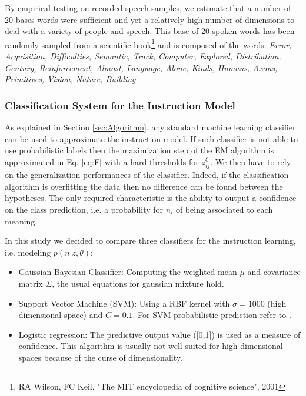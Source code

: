 By empirical testing on recorded speech samples, we estimate that a number of 20 bases words were sufficient and yet a relatively high number of dimensions to deal with a variety of people and speech. This base of 20 spoken words has been randomly sampled from a scientific book\footnote{RA Wilson, FC Keil, "The MIT encyclopedia of cognitive science", 2001} and is composed of the words: \emph{ \footnotesize{Error, Acquisition, Difficulties, Semantic, Track, Computer, Explored, Distribution, Century, Reinforcement, Almost, Language, Alone, Kinds, Humans, Axons, Primitives, Vision, Nature, Building}}.
%
\subsubsection{Classification System for the Instruction Model}
\label{sec:classifiers}
%
As explained in Section \ref{sec:Algorithm}, any standard machine learning classifier can be used to approximate the instruction model. If such classifier is not able to use probabilistic labels then the maximization step of the EM algorithm is approximated in Eq. \ref{eq:F} with a hard thresholds for $z_{ij}^{\xi}$. We then have to rely on the generalization performances of the classifier. Indeed, if the classification algorithm is overfitting the data then no difference can be found between the hypotheses. The only required characteristic is the ability to output a confidence on the class prediction, i.e. a probability for $n_i$ of being associated to each meaning.

In this study we decided to compare three classifiers for the instruction learning, i.e. modeling $p(n|z,\theta)$:
\begin{itemize}
\item Gaussian Bayesian Classifier: Computing the weighted mean $\mu$ and covariance matrix $\Sigma$, the usual equations for gaussian mixture hold.
\item Support Vector Machine (SVM): Using a RBF kernel with $\sigma = 1000$ (high dimensional space) and $C = 0.1$.  For SVM probabilistic prediction refer to \cite{platt1999probabilistic}.
\item Logistic regression: The predictive output value ([0,1]) is used as a measure of confidence. This algorithm is usually not well suited for high dimensional spaces because of the curse of dimensionality.
\end{itemize}
%
